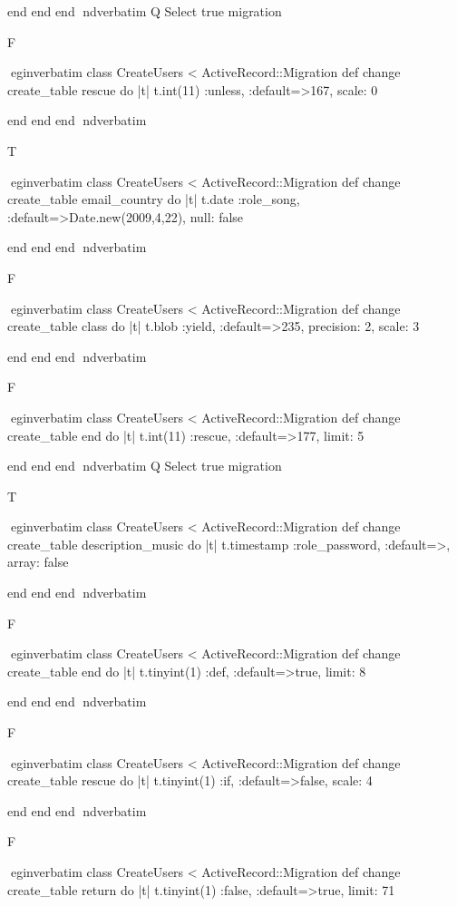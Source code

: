     end 
  end 
end
nd{verbatim}
Q
 Select true migration

F

egin{verbatim}
 class CreateUsers < ActiveRecord::Migration 
  def change 
    create_table rescue do |t| 
      t.int(11) :unless, :default=>167, scale: 0
    
    end 
  end 
end
nd{verbatim}

T

egin{verbatim}
 class CreateUsers < ActiveRecord::Migration 
  def change 
    create_table email_country do |t| 
      t.date :role_song, :default=>Date.new(2009,4,22), null: false
    
    end 
  end 
end
nd{verbatim}

F

egin{verbatim}
 class CreateUsers < ActiveRecord::Migration 
  def change 
    create_table class do |t| 
      t.blob :yield, :default=>235, precision: 2, scale: 3
    
    end 
  end 
end
nd{verbatim}

F

egin{verbatim}
 class CreateUsers < ActiveRecord::Migration 
  def change 
    create_table end do |t| 
      t.int(11) :rescue, :default=>177, limit: 5
    
    end 
  end 
end
nd{verbatim}
Q
 Select true migration

T

egin{verbatim}
 class CreateUsers < ActiveRecord::Migration 
  def change 
    create_table description_music do |t| 
      t.timestamp :role_password, :default=>, array: false
    
    end 
  end 
end
nd{verbatim}

F

egin{verbatim}
 class CreateUsers < ActiveRecord::Migration 
  def change 
    create_table end do |t| 
      t.tinyint(1) :def, :default=>true, limit: 8
    
    end 
  end 
end
nd{verbatim}

F

egin{verbatim}
 class CreateUsers < ActiveRecord::Migration 
  def change 
    create_table rescue do |t| 
      t.tinyint(1) :if, :default=>false, scale: 4
    
    end 
  end 
end
nd{verbatim}

F

egin{verbatim}
 class CreateUsers < ActiveRecord::Migration 
  def change 
    create_table return do |t| 
      t.tinyint(1) :false, :default=>true, limit: 71
    
